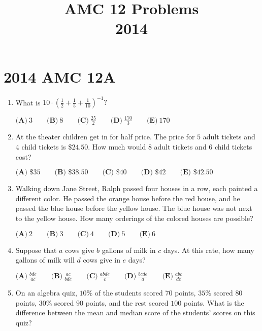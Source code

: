 \documentclass{article}
\title{AMC 12 Problems \\ 2014}
\date{}
\begin{document}
\maketitle\thispagestyle{fancy}\newpage\section*{2014 AMC 12A}\begin{enumerate}[label=\arabic*., itemsep=0.5em]\item What is \(10 \cdot \left(\tfrac{1}{2} + \tfrac{1}{5} + \tfrac{1}{10}\right)^{-1}?\)

\( \textbf{(A)}\ 3\qquad\textbf{(B)}\ 8\qquad\textbf{(C)}\ \frac{25}{2}\qquad\textbf{(D)}\ \frac{170}{3}\qquad\textbf{(E)}\ 170\)\par \vspace{0.5em}\item At the theater children get in for half price.  The price for \(5\) adult tickets and \(4\) child tickets is \(\$24.50\).  How much would \(8\) adult tickets and \(6\) child tickets cost?

\(\textbf{(A) }\$35\qquad
\textbf{(B) }\$38.50\qquad
\textbf{(C) }\$40\qquad
\textbf{(D) }\$42\qquad
\textbf{(E) }\$42.50\)\par \vspace{0.5em}\item Walking down Jane Street, Ralph passed four houses in a row, each painted a different color. He passed the orange house before the red house, and he passed the blue house before the yellow house. The blue house was not next to the yellow house. How many orderings of the colored houses are possible?

\( \textbf{(A)}\ 2\qquad\textbf{(B)}\ 3\qquad\textbf{(C)}\ 4\qquad\textbf{(D)}\ 5\qquad\textbf{(E)}\ 6\)\par \vspace{0.5em}\item Suppose that \(a\) cows give \(b\) gallons of milk in \(c\) days. At this rate, how many gallons of milk will \(d\) cows give in \(e\) days?

\( \textbf{(A)}\ \frac{bde}{ac}\qquad\textbf{(B)}\ \frac{ac}{bde}\qquad\textbf{(C)}\ \frac{abde}{c}\qquad\textbf{(D)}\ \frac{bcde}{a}\qquad\textbf{(E)}\ \frac{abc}{de}\)\par \vspace{0.5em}\item On an algebra quiz, \(10\%\) of the students scored \(70\) points, \(35\%\) scored \(80\) points, \(30\%\) scored \(90\) points, and the rest scored \(100\) points. What is the difference between the mean and median score of the students' scores on this quiz?


\end{enumerate}
\end{document}

